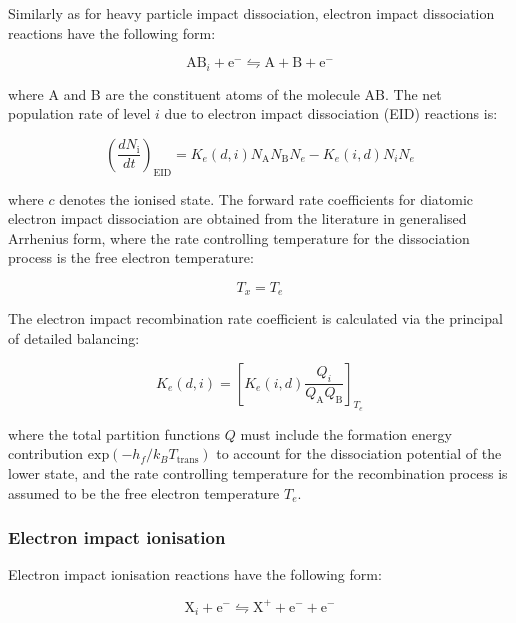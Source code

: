Similarly as for heavy particle impact dissociation, electron impact dissociation reactions have the following form:

\begin{equation}
 \text{AB}_i + \text{e}^- \leftrightharpoons  \text{A} + \text{B} + \text{e}^-
\end{equation}

\noindent where A and B are the constituent atoms of the molecule AB.
The net population rate of level $i$ due to electron impact dissociation (EID) reactions is:

\begin{equation}
 \left ( \frac{dN_\text{i}}{dt} \right )_\text{EID} =  K_{e}(d,i) N_\text{A} N_\text{B} N_{e} - K_{e} (i,d) N_{i} N_{e} 
\end{equation}

\noindent where $c$ denotes the ionised state.
The forward rate coefficients for diatomic electron impact dissociation are obtained from the literature in generalised Arrhenius form, where the rate controlling temperature for the dissociation process is the free electron temperature:

\begin{equation}
 T_x = T_e
\end{equation}

The electron impact recombination rate coefficient is calculated via the principal of detailed balancing:

\begin{equation}
 K_{e}(d,i) = \left [ K_{e}(i,d) \frac{Q_i}{Q_\text{A} Q_\text{B}} \right ]_{T_e}
\end{equation}

\noindent where the total partition functions $Q$ must include the formation energy contribution $\text{exp} \left ( - h_f / k_B T_\text{trans} \right )$ to account for the dissociation potential of the lower state, and the rate controlling temperature for the recombination process is assumed to be the free electron temperature $T_e$.

\subsubsection{Electron impact ionisation}

Electron impact ionisation reactions have the following form:

\begin{equation}
 \text{X}_i + \text{e}^- \leftrightharpoons  \text{X}^+ + \text{e}^- + \text{e}^-
\end{equation}

